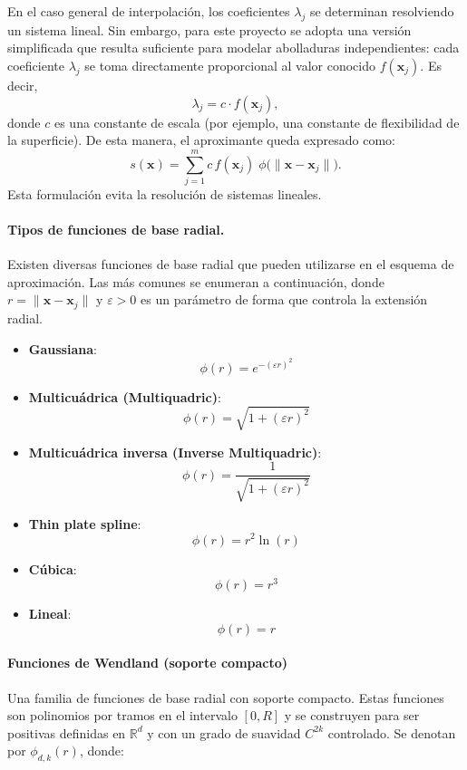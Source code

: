 \documentclass[12pt, letterpaper]{article}
\begin{document}
En el caso general de interpolación, los coeficientes \(\lambda_j\) se determinan resolviendo un sistema lineal. Sin embargo, para este proyecto se adopta una versión simplificada que resulta suficiente para modelar abolladuras independientes: cada coeficiente \(\lambda_j\) se toma directamente proporcional al valor conocido \(f(\mathbf{x}_j)\). Es decir,
\[
\lambda_j = c \cdot f(\mathbf{x}_j),
\]
donde \(c\) es una constante de escala (por ejemplo, una constante de flexibilidad de la superficie). De esta manera, el aproximante queda expresado como:
\[
s(\mathbf{x}) = \sum_{j=1}^{m} c \, f(\mathbf{x}_j) \; \phi\bigl(\|\mathbf{x} - \mathbf{x}_j\|\bigr).
\]
Esta formulación evita la resolución de sistemas lineales.

\paragraph{Tipos de funciones de base radial.}

Existen diversas funciones de base radial que pueden utilizarse en el esquema de aproximación. Las más comunes se enumeran a continuación, donde \(r = \|\mathbf{x} - \mathbf{x}_j\|\) y \(\varepsilon > 0\) es un parámetro de forma que controla la extensión radial.

\begin{itemize}
    \item \textbf{Gaussiana}: 
    \[
    \phi(r) = e^{-(\varepsilon r)^2}
    \]

    \item \textbf{Multicuádrica (Multiquadric)}: 
    \[
    \phi(r) = \sqrt{1 + (\varepsilon r)^2}
    \]

    \item \textbf{Multicuádrica inversa (Inverse Multiquadric)}: 
    \[
    \phi(r) = \frac{1}{\sqrt{1 + (\varepsilon r)^2}}
    \]

    \item \textbf{Thin plate spline}: 
    \[
    \phi(r) = r^2 \ln(r)
    \]

    \item \textbf{Cúbica}: 
    \[
    \phi(r) = r^3
    \]

    \item \textbf{Lineal}: 
    \[
    \phi(r) = r
    \]
\end{itemize}

\paragraph{Funciones de Wendland (soporte compacto)}
Una familia de funciones de base radial con soporte compacto. Estas funciones son polinomios por tramos en el intervalo \([0, R]\) y se construyen para ser positivas definidas en \(\mathbb{R}^d\) y con un grado de suavidad \(C^{2k}\) controlado. Se denotan por \(\phi_{d,k}(r)\), donde:
\end{document}
